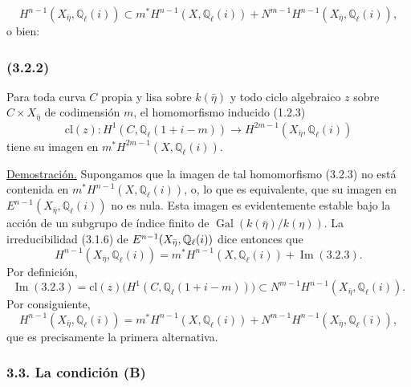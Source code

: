 \pageoriginale

\begin{equation}\tag{3.2.1}
H^{n-1}(X_{\bar\eta},\mathbb Q_\ell(i))
\subset m^*H^{n-1}(X,\mathbb Q_\ell(i))
+N^{m-1}H^{n-1}(X_{\bar\eta},\mathbb Q_\ell(i)),
\end{equation}
o bien:

\subsubsection*{(3.2.2)}
Para toda curva $C$ propia y lisa sobre $k(\bar\eta)$ y todo ciclo
algebraico $z$ sobre $C\times X_{\bar\eta}$ de codimensión $m$, el
homomorfismo inducido (1.2.3)
\begin{equation}\tag{3.2.3}
\mathrm{cl}(z):H^1(C,\mathbb Q_\ell(1+i-m))
\longrightarrow H^{2m-1}(X_{\bar\eta},\mathbb Q_\ell(i))
\end{equation}
tiene su imagen en $m^*H^{2m-1}(X,\mathbb Q_\ell(i))$.

\noindent\underline{Demostración.}
Supongamos que la imagen de tal homomorfismo (3.2.3) no está contenida
en $m^*H^{n-1}(X,\mathbb Q_\ell(i))$, o, lo que es equivalente, que su
imagen en $E^{n-1}(X_{\bar\eta},\mathbb Q_\ell(i))$ no es nula. Esta
imagen es evidentemente estable bajo la acción de un subgrupo de índice
finito de $\operatorname{Gal}(k(\bar\eta)/k(\eta))$. La irreducibilidad
(3.1.6) de $E^{n-1}(X_{\bar\eta},\mathbb Q_\ell(i))$ dice entonces que
\begin{equation*}
H^{n-1}(X_{\bar\eta},\mathbb Q_\ell(i))
=m^*H^{n-1}(X,\mathbb Q_\ell(i))+\operatorname{Im}(3.2.3).
\end{equation*}
Por definición,
\begin{equation*}
\operatorname{Im}(3.2.3)
=\mathrm{cl}(z)\bigl(H^1(C,\mathbb Q_\ell(1+i-m))\bigr)
\subset N^{m-1}H^{n-1}(X_{\bar\eta},\mathbb Q_\ell(i)).
\end{equation*}
Por consiguiente,
\begin{equation*}
H^{n-1}(X_{\bar\eta},\mathbb Q_\ell(i))
=m^*H^{n-1}(X,\mathbb Q_\ell(i))
+N^{m-1}H^{n-1}(X_{\bar\eta},\mathbb Q_\ell(i)),
\end{equation*}
que es precisamente la primera alternativa.

\pageoriginale

\subsubsection*{3.3. La condición (B)}

